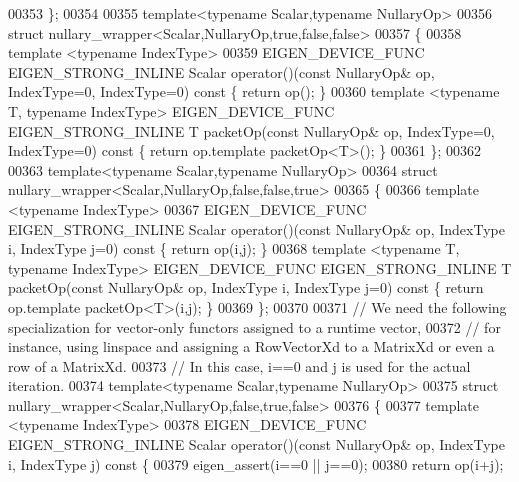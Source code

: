 \begin{DoxyCode}
00353 \};
00354 
00355 \textcolor{keyword}{template}<\textcolor{keyword}{typename} Scalar,\textcolor{keyword}{typename} NullaryOp>
00356 \textcolor{keyword}{struct }nullary\_wrapper<Scalar,NullaryOp,true,false,false>
00357 \{
00358   \textcolor{keyword}{template} <\textcolor{keyword}{typename} IndexType>
00359   EIGEN\_DEVICE\_FUNC EIGEN\_STRONG\_INLINE Scalar operator()(\textcolor{keyword}{const} NullaryOp& op, IndexType=0, IndexType=0)\textcolor{keyword}{
       const }\{ \textcolor{keywordflow}{return} op(); \}
00360   \textcolor{keyword}{template} <\textcolor{keyword}{typename} T, \textcolor{keyword}{typename} IndexType> EIGEN\_DEVICE\_FUNC EIGEN\_STRONG\_INLINE T packetOp(\textcolor{keyword}{const} 
      NullaryOp& op, IndexType=0, IndexType=0)\textcolor{keyword}{ const }\{ \textcolor{keywordflow}{return} op.template packetOp<T>(); \}
00361 \};
00362 
00363 \textcolor{keyword}{template}<\textcolor{keyword}{typename} Scalar,\textcolor{keyword}{typename} NullaryOp>
00364 \textcolor{keyword}{struct }nullary\_wrapper<Scalar,NullaryOp,false,false,true>
00365 \{
00366   \textcolor{keyword}{template} <\textcolor{keyword}{typename} IndexType>
00367   EIGEN\_DEVICE\_FUNC EIGEN\_STRONG\_INLINE Scalar operator()(\textcolor{keyword}{const} NullaryOp& op, IndexType i, IndexType j=0)\textcolor{keyword}{
       const }\{ \textcolor{keywordflow}{return} op(i,j); \}
00368   \textcolor{keyword}{template} <\textcolor{keyword}{typename} T, \textcolor{keyword}{typename} IndexType> EIGEN\_DEVICE\_FUNC EIGEN\_STRONG\_INLINE T packetOp(\textcolor{keyword}{const} 
      NullaryOp& op, IndexType i, IndexType j=0)\textcolor{keyword}{ const }\{ \textcolor{keywordflow}{return} op.template packetOp<T>(i,j); \}
00369 \};
00370 
00371 \textcolor{comment}{// We need the following specialization for vector-only functors assigned to a runtime vector,}
00372 \textcolor{comment}{// for instance, using linspace and assigning a RowVectorXd to a MatrixXd or even a row of a MatrixXd.}
00373 \textcolor{comment}{// In this case, i==0 and j is used for the actual iteration.}
00374 \textcolor{keyword}{template}<\textcolor{keyword}{typename} Scalar,\textcolor{keyword}{typename} NullaryOp>
00375 \textcolor{keyword}{struct }nullary\_wrapper<Scalar,NullaryOp,false,true,false>
00376 \{
00377   \textcolor{keyword}{template} <\textcolor{keyword}{typename} IndexType>
00378   EIGEN\_DEVICE\_FUNC EIGEN\_STRONG\_INLINE Scalar operator()(\textcolor{keyword}{const} NullaryOp& op, IndexType i, IndexType j)\textcolor{keyword}{
       const }\{
00379     eigen\_assert(i==0 || j==0);
00380     \textcolor{keywordflow}{return} op(i+j);

\end{DoxyCode}
